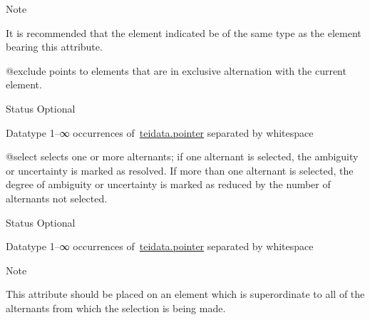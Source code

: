 \begin{reflist}
\begin{sansreflist}
\begin{reflist}
    \item[{Note}]
  \par
It is recommended that the element indicated be of the same type as the element bearing this attribute.
\end{reflist}  
    \item[@exclude]
  points to elements that are in exclusive alternation with the current element.
\begin{reflist}
    \item[{Status}]
  Optional
    \item[{Datatype}]
  1–∞ occurrences of \hyperref[TEI.teidata.pointer]{teidata.pointer} separated by whitespace
\end{reflist}  
    \item[@select]
  selects one or more alternants; if one alternant is selected, the ambiguity or uncertainty is marked as resolved. If more than one alternant is selected, the degree of ambiguity or uncertainty is marked as reduced by the number of alternants not selected.
\begin{reflist}
    \item[{Status}]
  Optional
    \item[{Datatype}]
  1–∞ occurrences of \hyperref[TEI.teidata.pointer]{teidata.pointer} separated by whitespace
    \item[{Note}]
  \par
This attribute should be placed on an element which is superordinate to all of the alternants from which the selection is being made.
\end{reflist}  
\end{sansreflist}  
\end{reflist}  

